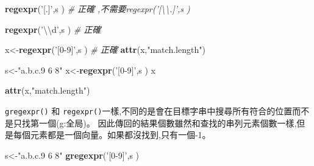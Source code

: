 \documentclass[]{book}
\newenvironment{Shaded}{\begin{snugshade}}{\end{snugshade}}
\newcommand{\CharTok}[1]{\textcolor[rgb]{0.31,0.60,0.02}{#1}}
\newcommand{\CommentTok}[1]{\textcolor[rgb]{0.56,0.35,0.01}{\textit{#1}}}
\newcommand{\KeywordTok}[1]{\textcolor[rgb]{0.13,0.29,0.53}{\textbf{#1}}}
\newcommand{\NormalTok}[1]{#1}
\newcommand{\StringTok}[1]{\textcolor[rgb]{0.31,0.60,0.02}{#1}}
\theoremstyle{definition}
\theoremstyle{definition}
\theoremstyle{definition}
\theoremstyle{remark}
\begin{document}
\begin{Shaded}
\begin{Highlighting}[]
\KeywordTok{regexpr}\NormalTok{(}\StringTok{'[.]'}\NormalTok{,s ) }\CommentTok{# 正確 ,不需要regexpr('[\textbackslash{}\textbackslash{}.]',s )}
\end{Highlighting}
\end{Shaded}

\begin{Shaded}
\begin{Highlighting}[]
\KeywordTok{regexpr}\NormalTok{(}\StringTok{'}\CharTok{\textbackslash{}\textbackslash{}}\StringTok{d'}\NormalTok{,s ) }\CommentTok{# 正確}
\end{Highlighting}
\end{Shaded}

\begin{Shaded}
\begin{Highlighting}[]
\NormalTok{x<-}\KeywordTok{regexpr}\NormalTok{(}\StringTok{'[0-9]'}\NormalTok{,s ) }\CommentTok{# 正確}
\KeywordTok{attr}\NormalTok{(x,}\StringTok{"match.length"}\NormalTok{)}
\end{Highlighting}
\end{Shaded}

\begin{Shaded}
\begin{Highlighting}[]
\NormalTok{s<-}\StringTok{"a.b.c.9 6 8"}
\NormalTok{x<-}\KeywordTok{regexpr}\NormalTok{(}\StringTok{'[0-9]'}\NormalTok{,s ) }
\NormalTok{x}
\end{Highlighting}
\end{Shaded}

\begin{Shaded}
\begin{Highlighting}[]
\KeywordTok{attr}\NormalTok{(x,}\StringTok{"match.length"}\NormalTok{)}
\end{Highlighting}
\end{Shaded}

\texttt{gregexpr()} 和
\texttt{regexpr()}一樣,不同的是會在目標字串中搜尋所有符合的位置而不是只找第一個(g:全局)。
因此傳回的結果個數雖然和查找的串列元素個數一樣,但是每個元素都是一個向量。如果都沒找到,只有一個-1。

\begin{Shaded}
\begin{Highlighting}[]
\NormalTok{s<-}\StringTok{"a.b.c.9 6 8"}
 \KeywordTok{gregexpr}\NormalTok{(}\StringTok{'[0-9]'}\NormalTok{,s ) }
\end{Highlighting}
\end{Shaded}
\end{document}
